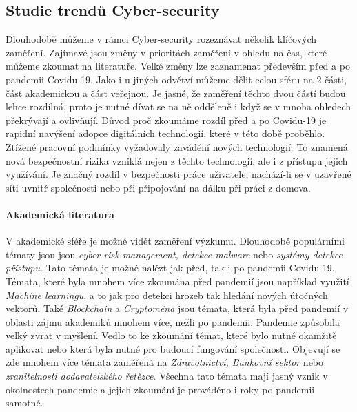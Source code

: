 \subsection{Studie trendů Cyber-security}
Dlouhodobě můžeme v rámci Cyber-security rozeznávat několik klíčových zaměření.
Zajímavé jsou změny v prioritách zaměření v ohledu na čas, které můžeme zkoumat na literatuře.
Velké změny lze zaznamenat především před a po pandemii Covidu-19.\cite{KUMAR2022102821}
Jako i u jiných odvětví můžeme dělit celou sféru na 2 části, část akademickou a část veřejnou.
Je jasné, že zaměření těchto dvou částí budou lehce rozdílná, proto je nutné dívat se na ně odděleně i když se v mnoha ohledech překrývají a ovlivňují.
Důvod proč zkoumáme rozdíl před a po Covidu-19 je rapidní navýšení adopce digitálních technologií, které v této době proběhlo.
Ztížené pracovní podmínky vyžadovaly zavádění nových technologií.
To znamená nová bezpečnostní rizika vzniklá nejen z těchto technologií, ale i z přístupu jejich využívání.
Je značný rozdíl v bezpečnosti práce uživatele, nachází-li se v uzavřené síti uvnitř společnosti nebo při připojování na dálku při práci z domova.

\paragraph{Akademická literatura}
V akademické sféře je možné vidět zaměření výzkumu.
Dlouhodobě populárními tématy jsou jsou \textit{cyber risk management, detekce malware} nebo \textit{systémy detekce přístupu}.\cite{KUMAR2022102821}
Tato témata je možné nalézt jak před, tak i po pandemii Covidu-19.
Témata, které byla mnohem více zkoumána před pandemií jsou například využití \textit{Machine learningu}, a to jak pro detekci hrozeb tak hledání nových útočných vektorů.
Také \textit{Blockchain} a \textit{Cryptoměna} jsou témata, která byla před pandemií v oblasti zájmu akademiků mnohem více, nežli po pandemii.\cite{KUMAR2022102821}
Pandemie způsobila velký zvrat v myšlení.
Vedlo to ke zkoumání témat, které bylo nutné okamžitě aplikovat nebo která byla nutné pro budoucí fungování společnosti.
Objevují se zde mnohem více témata zaměřená na \textit{Zdravotnictví, Bankovní sektor} nebo \textit{zranitelnosti dodavatelského řetězce}.\cite{KUMAR2022102821}
Všechna tato témata mají jasný vznik v okolnostech pandemie a jejich zkoumání je prováděno i roky po pandemii samotné.

